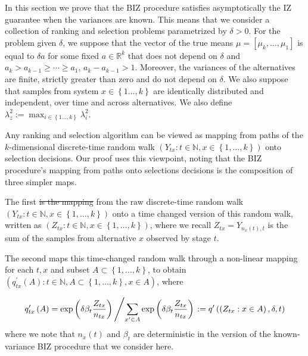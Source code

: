\documentclass{wscpaperproc}
\theoremstyle{wsc}
\providecommand{\DIFaddtex}[1]{{\protect\color{blue}\uwave{#1}}} %
\providecommand{\DIFdeltex}[1]{{\protect\color{red}\sout{#1}}}                      %
\providecommand{\DIFaddbegin}{} %
\providecommand{\DIFaddend}{} %
\providecommand{\DIFdelbegin}{} %
\providecommand{\DIFdelend}{} %
\providecommand{\DIFadd}[1]{\texorpdfstring{\DIFaddtex{#1}}{#1}} %
\providecommand{\DIFdel}[1]{\texorpdfstring{\DIFdeltex{#1}}{}} %
\begin{document}
In this section we prove that the BIZ procedure satisfies asymptotically the IZ guarantee
when the variances are known. This means that we consider a collection of
ranking and selection problems parametrized by $\delta>0$.  
For the problem given $\delta$, we suppose that the vector of the true means
\DIFdelbegin \DIFdel{$\mu=\left[\mu_{k},\ldots,\mu_{1}\right]$ }\DIFdelend \DIFaddbegin \DIFadd{$\mu=\left[\mu_{1},\ldots,\mu_{k}\right]$ }\DIFaddend is equal to $\delta a$ for some fixed $a\in\mathbb{R}^{k}$ that
does not depend on $\delta$ and $a_{k}>a_{k-1}\geq \cdots \geq a_{1}$, $a_{k}-a_{k-1}>1$.
Moreover, the variances of the alternatives are finite, strictly greater than zero and do not depend on $\delta$.
We also suppose that samples from system $x\in\left\{ 1\ldots,k\right\} $ are identically distributed
and independent, over time and across alternatives. We also define
$\lambda_{z}^{2}:=\max_{i\in\left\{ 1\ldots,k\right\} }\lambda_{i}^{2}$.

Any ranking and selection algorithm can be viewed as mapping from
paths of the $k$-dimensional discrete-time random walk $\left(Y_{tx}:t\in\mathbb{N},x\in\left\{ 1,\ldots,k\right\} \right)$
onto selection decisions. 
Our proof uses this viewpoint, noting that 
the BIZ procedure's mapping from paths onto
selections decisions is the composition of three
simpler maps.

The first \DIFdelbegin \DIFdel{is the mapping }\DIFdelend \DIFaddbegin \DIFadd{mapping is }\DIFaddend from the raw discrete-time random walk $\left(Y_{tx}:t\in\mathbb{N},x\in\left\{ 1,\ldots,k\right\} \right)$
onto a time changed version of this random walk, written as $\left(Z_{tx}:t\in\mathbb{N},x\in\left\{ 1,\ldots,k\right\} \right)$,
where we recall \DIFdelbegin \DIFdel{$Z_{tx}=Y_{n_{x}\left(t\right),t}$ }\DIFdelend \DIFaddbegin \DIFadd{$Z_{tx}=Y_{n_{tx},x}$ }\DIFaddend is the sum of
the samples from alternative $x$ observed by stage $t$.

The second \DIFaddbegin \DIFadd{one }\DIFaddend maps this time-changed random walk through a non-linear
mapping for each $t,x$ and subset $A\subset\left\{ 1,\ldots,k\right\} $,
to obtain $\left(q_{tx}^{'}\left(A\right):t\in\mathbb{N},A\subset\left\{ 1,\ldots,k\right\} ,x\in A\right)$,
where

\[
q'_{tx}\left(A\right)=\mbox{exp}\left(\delta\beta_{t}\frac{Z_{tx}}{n_{tx}}\right)\left/\sum_{x'\in A}\mbox{exp}\left(\delta\beta_{t}\frac{Z_{tx}}{n_{tx}}\right)\right.:=q'\left(\left(Z_{tx}:x\in A\right),\delta,t\right)
\]
where we note that $n_{x}\left(t\right)$ and $\beta_{t}$ are deterministic
in the version of the known-variance BIZ procedure that we consider
here.
\end{document}
